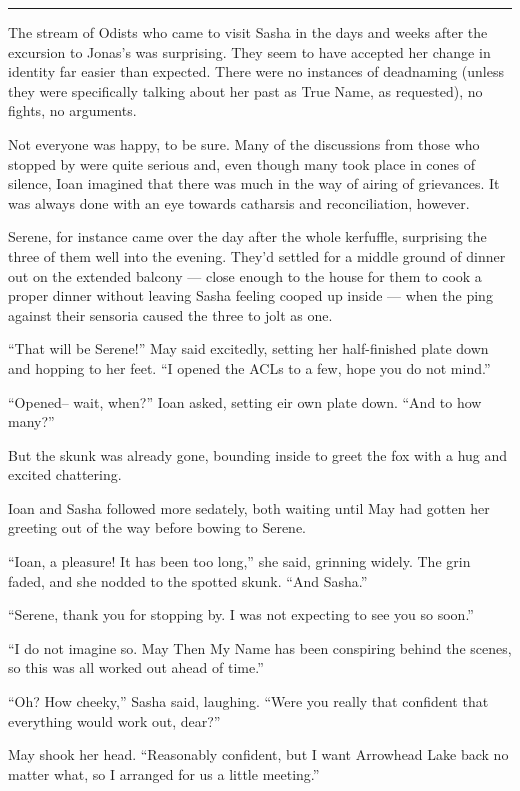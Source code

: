 \begin{center}\rule{0.5\linewidth}{0.5pt}\end{center}

The stream of Odists who came to visit Sasha in the days and weeks after the excursion to Jonas's was surprising. They seem to have accepted her change in identity far easier than expected. There were no instances of deadnaming (unless they were specifically talking about her past as True Name, as requested), no fights, no arguments.

Not everyone was happy, to be sure. Many of the discussions from those who stopped by were quite serious and, even though many took place in cones of silence, Ioan imagined that there was much in the way of airing of grievances. It was always done with an eye towards catharsis and reconciliation, however.

Serene, for instance came over the day after the whole kerfuffle, surprising the three of them well into the evening. They'd settled for a middle ground of dinner out on the extended balcony — close enough to the house for them to cook a proper dinner without leaving Sasha feeling cooped up inside — when the ping against their sensoria caused the three to jolt as one.

``That will be Serene!'' May said excitedly, setting her half-finished plate down and hopping to her feet. ``I opened the ACLs to a few, hope you do not mind.''

``Opened-- wait, when?'' Ioan asked, setting eir own plate down. ``And to how many?''

But the skunk was already gone, bounding inside to greet the fox with a hug and excited chattering.

Ioan and Sasha followed more sedately, both waiting until May had gotten her greeting out of the way before bowing to Serene.

``Ioan, a pleasure! It has been too long,'' she said, grinning widely. The grin faded, and she nodded to the spotted skunk. ``And Sasha.''

``Serene, thank you for stopping by. I was not expecting to see you so soon.''

``I do not imagine so. May Then My Name has been conspiring behind the scenes, so this was all worked out ahead of time.''

``Oh? How cheeky,'' Sasha said, laughing. ``Were you really that confident that everything would work out, dear?''

May shook her head. ``Reasonably confident, but I want Arrowhead Lake back no matter what, so I arranged for us a little meeting.''

